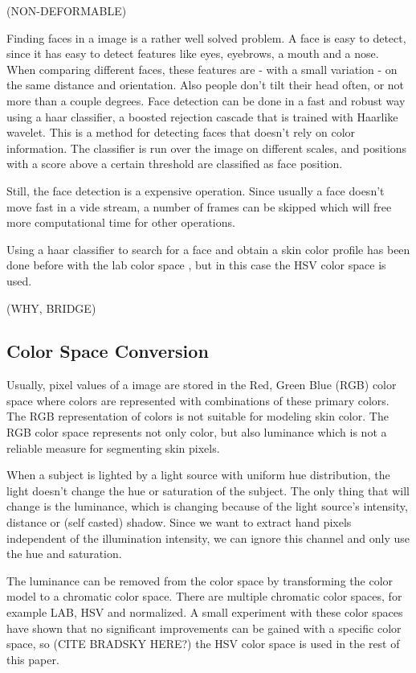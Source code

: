 (NON-DEFORMABLE)

Finding faces in a image is a rather well solved problem. A face is easy to detect, since it has easy to detect features like eyes, eyebrows, a mouth and a nose. When comparing different faces, these features are - with a small variation - on the same distance and orientation. Also people don't tilt their head often, or not more than a couple degrees. Face detection can be done in a fast and robust way using a haar classifier, a boosted rejection cascade that is trained with Haar\-like wavelet\cite{Lienhart2002}. This is a method for detecting faces that doesn't rely on color information. The classifier is run over the image on different scales, and positions with a score above a certain threshold are classified as face position.

Still, the face detection is a expensive operation. Since usually a face doesn't move fast in a vide stream, a number of frames can be skipped which will free more computational time for other operations.

Using a haar classifier to search for a face and obtain a skin color profile has been done before with the lab color space \cite{Stenger2006}, but in this case the HSV color space is used.

(WHY, BRIDGE)

\subsection*{Color Space Conversion}
Usually, pixel values of a image are stored in the Red, Green Blue (RGB) color space where colors are represented with combinations of these primary colors. The RGB representation of colors is not suitable for modeling skin color. The RGB color space represents not only color, but also luminance which is not a reliable measure for segmenting skin pixels\cite{Cai1999}.

When a subject is lighted by a light source with uniform hue distribution, the light doesn't change the hue or saturation of the subject. The only thing that will change is the luminance, which is changing because of the light source's intensity, distance or (self casted) shadow. Since we want to extract hand pixels independent of the illumination intensity, we can ignore this channel and only use the hue and saturation.

The luminance can be removed from the color space by transforming the color model to a chromatic color space. There are multiple chromatic color spaces, for example LAB, HSV and normalized. A small experiment with these color spaces have shown that no significant improvements can be gained with a specific color space, so (CITE BRADSKY HERE?) the HSV color space is used in the rest of this paper.

